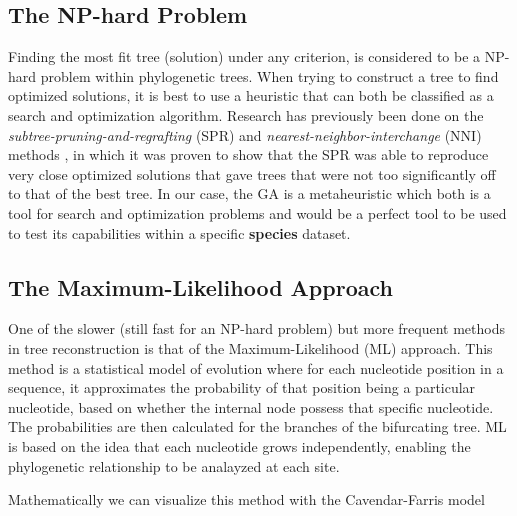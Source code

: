 \subsection{The NP-hard Problem}

Finding the most fit tree (solution) under any criterion, is considered to be a NP-hard problem within phylogenetic trees. When trying to construct a tree to find optimized solutions, it is best to use a heuristic that can both be classified as a search and optimization algorithm. Research has previously been done on the \emph{subtree-pruning-and-regrafting} (SPR) and \emph{nearest-neighbor-interchange} (NNI) methods \cite{Money}, in which it was proven to show that the SPR was able to reproduce very close optimized solutions that gave trees that were not too significantly off to that of the best tree. In our case, the GA is a metaheuristic which both is a tool for search and optimization problems and would be a perfect tool to be used to test its capabilities within a specific \textbf{species} dataset.

\subsection{The Maximum-Likelihood Approach}

One of the slower (still fast for an NP-hard problem) but more frequent methods in tree reconstruction is that of the Maximum-Likelihood (ML) approach. This method is a statistical model of evolution where for each nucleotide position in a sequence, it approximates the probability of that position being a particular nucleotide, based on whether the internal node possess that specific nucleotide. The probabilities are then calculated for the branches of the bifurcating tree. ML is based on the idea that each nucleotide grows independently, enabling the phylogenetic relationship to be analayzed at each site. 

Mathematically we can visualize this method with the Cavendar-Farris model \cite{Roch}

